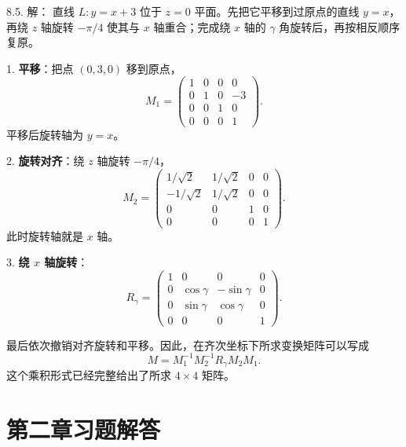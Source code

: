 \begin{exer}
8.5. 解：
直线 $L:y=x+3$ 位于 $z=0$ 平面。先把它平移到过原点的直线 $y=x$，再绕 $z$ 轴旋转 $-\pi/4$ 使其与 $x$ 轴重合；完成绕 $x$ 轴的 $\gamma$ 角旋转后，再按相反顺序复原。

1. \textbf{平移}：把点 $(0,3,0)$ 移到原点，
$$
M_1=\begin{pmatrix}
1&0&0&0\\0&1&0&-3\\0&0&1&0\\0&0&0&1
\end{pmatrix}.
$$
平移后旋转轴为 $y=x$。

2. \textbf{旋转对齐}：绕 $z$ 轴旋转 $-\pi/4$，
$$
M_2=\begin{pmatrix}
1/\sqrt2&1/\sqrt2&0&0\\
-1/\sqrt2&1/\sqrt2&0&0\\
0&0&1&0\\0&0&0&1
\end{pmatrix}.
$$
此时旋转轴就是 $x$ 轴。

3. \textbf{绕 $x$ 轴旋转}：
$$
R_\gamma=\begin{pmatrix}
1&0&0&0\\
0&\cos\gamma&-\sin\gamma&0\\
0&\sin\gamma&\cos\gamma&0\\
0&0&0&1
\end{pmatrix}.
$$

最后依次撤销对齐旋转和平移。因此，在齐次坐标下所求变换矩阵可以写成
$$
M=M_1^{-1}M_2^{-1}R_\gamma M_2M_1.
$$
这个乘积形式已经完整给出了所求 $4\times4$ 矩阵。

\vspace{5ex}

\end{exer}


\section*{第二章习题解答}


